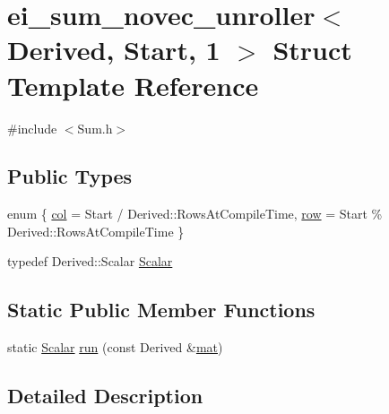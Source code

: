 \hypertarget{structei__sum__novec__unroller_3_01_derived_00_01_start_00_011_01_4}{\section{ei\-\_\-sum\-\_\-novec\-\_\-unroller$<$ Derived, Start, 1 $>$ Struct Template Reference}
\label{structei__sum__novec__unroller_3_01_derived_00_01_start_00_011_01_4}
}


{\ttfamily \#include $<$Sum.\-h$>$}

\subsection*{Public Types}
\begin{DoxyCompactItemize}
\item 
enum \{ \hyperlink{structei__sum__novec__unroller_3_01_derived_00_01_start_00_011_01_4_a7558a0411259e2fd5fc09e206afc4b61ad9d8c5c031963d73cd16a29bae631096}{col} = Start / Derived\-:\-:Rows\-At\-Compile\-Time, 
\hyperlink{structei__sum__novec__unroller_3_01_derived_00_01_start_00_011_01_4_a7558a0411259e2fd5fc09e206afc4b61a3f12d909ff8546d951e2a21234ec9bf0}{row} = Start \% Derived\-:\-:Rows\-At\-Compile\-Time
 \}
\item 
typedef Derived\-::\-Scalar \hyperlink{structei__sum__novec__unroller_3_01_derived_00_01_start_00_011_01_4_ae54f9f138b17a0cfa4ed0a2a168929ec}{Scalar}
\end{DoxyCompactItemize}
\subsection*{Static Public Member Functions}
\begin{DoxyCompactItemize}
\item 
static \hyperlink{structei__sum__novec__unroller_3_01_derived_00_01_start_00_011_01_4_ae54f9f138b17a0cfa4ed0a2a168929ec}{Scalar} \hyperlink{structei__sum__novec__unroller_3_01_derived_00_01_start_00_011_01_4_ad8b62669cc0382e5cc2f5b27b91e8f3c}{run} (const Derived \&\hyperlink{uavobjecttemplate_8m_a16a51e808b16c46bbfd36da2e37cd123}{mat})
\end{DoxyCompactItemize}


\subsection{Detailed Description}
